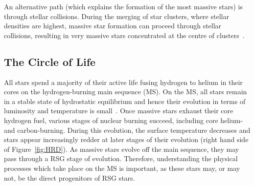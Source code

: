 An alternative path (which explains the formation of the most massive stars) is through stellar collisions.
During the merging of star clusters, where stellar densities are highest, massive star formation can proceed through stellar collisions, resulting in very massive stars concentrated at the centre of clusters~\citep{Fujii13}.



\subsection{The Circle of Life} %
\label{sub:life_cycle}


All stars spend a majority of their active life fusing hydrogen to helium in their cores on the hydrogen-burning main sequence (MS).
On the MS, all stars remain in a stable state of hydrostatic equilibrium and hence their evolution in terms of luminosity and temperature is small~\citep{b:KippenhahnWeigert}.
Once massive stars exhaust their core hydrogen fuel, various stages of nuclear burning succeed, including core helium- and carbon-burning.
During this evolution, the surface temperature decreases and stars appear increasingly redder at later stages of their evolution (right hand side of Figure~\ref{fig:HRD}).
As massive stars evolve off the main sequence, they may pass through a RSG stage of evolution.
Therefore, understanding the physical processes which take place on the MS is important, as these stars may, or may not, be the direct progenitors of RSG stars.

